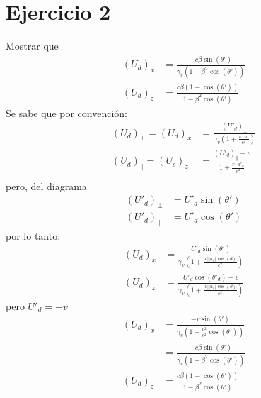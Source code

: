 \section*{Ejercicio 2}
Mostrar que
    \begin{align*}
        (U_d)_x &= \frac{-c\beta \sin({\theta}')}{\gamma_v (1-\beta^2 \cos({\theta}'))}\\
        (U_d)_z &= \frac{c\beta (1-\cos({\theta}'))}{1-\beta^2 \cos({\theta}')}
    \end{align*}
    Se sabe que por convención:
    \begin{align*}
        (U_d)_\perp = (U_d)_x &= \frac{({U}'_d)_\perp}{\gamma_v \left(1+\frac{v \cdot {u}'}{c^2} \right)}\\
        (U_d)_\parallel = (U_c)_z &= \frac{({U}'_d)_\parallel+v}{1+\frac{v \cdot {u}'_d}{c^2}}\\
    \end{align*}
    pero, del diagrama
    \begin{align*}
        ({U}'_d)_\perp &= {U}'_d \sin({\theta}')\\
        ({U}'_d)_\parallel&={U}'_d \cos({\theta}')
    \end{align*}
    por lo tanto:
    \begin{align*}
        (U_d)_x &= \frac{{U}'_d \sin({\theta}')}{\gamma_v \left(1+\frac{|v||u_d|\cos(\theta)}{c^2} \right)}\\
        (U_d)_z &= \frac{{U}'_d \cos({\theta}'_d)+v}{\gamma_v \left(1+\frac{|v||u_d|\cos(\theta)}{c^2} \right)}
    \end{align*}
    pero ${U}'_d =-v$
    \begin{align*}
        (U_d)_x &= \frac{-v \sin({\theta}')}{\gamma_v \left(1- \frac{v^2}{c^2}\cos({\theta}') \right)}\\
        & = \frac{-c\beta \sin({\theta}')}{\gamma_v (1-\beta^2 \cos({\theta}'))}\\
        (U_d)_z &= \frac{c\beta (1-\cos({\theta}'))}{1-\beta^2 \cos({\theta}')}
    \end{align*}
